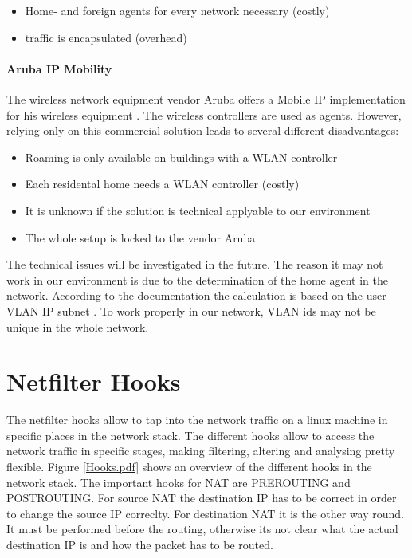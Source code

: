 \documentclass{report}
\begin{document}
\begin{itemize}
\itemsep1pt\parskip0pt
\item
  Home- and foreign agents for every network necessary (costly)
\item
  traffic is encapsulated (overhead)
\end{itemize}

\paragraph{Aruba IP Mobility}\label{aruba-ip-mobility}

The wireless network equipment vendor Aruba offers a Mobile IP
implementation for his wireless equipment \cite[p. 659]{MobileIP-Aruba}. The wireless
controllers are used as agents. However, relying only on this commercial
solution leads to several different disadvantages:

\begin{itemize}
\itemsep1pt\parskip0pt
\item
  Roaming is only available on buildings with a WLAN controller
\item
  Each residental home needs a WLAN controller (costly)
\item
  It is unknown if the solution is technical applyable to our environment
\item
  The whole setup is locked to the vendor Aruba
\end{itemize}

The technical issues will be investigated in the future. The reason it may not
work in our environment is due to the determination of the home agent in the network.
According to the documentation the calculation is based on the user VLAN IP subnet \cite[p. 661]{MobileIP-Aruba}.
To work properly in our network, VLAN ids may not be unique in the whole network.


\section{Netfilter Hooks}\label{netfilter-hooks}

The netfilter hooks\cite{hooks} allow to tap into the network traffic on a linux
machine in specific places in the network stack. The different hooks
allow to access the network traffic in specific stages, making filtering,
altering and analysing pretty flexible. Figure \ref{Hooks.pdf} shows an overview of the different hooks in the network stack.
The important hooks for NAT are PREROUTING and
POSTROUTING. For source NAT the destination IP has to be correct in order to change the source IP correclty. For destination NAT
it is the other way round. It must be performed before the routing,
otherwise its not clear what the actual destination IP is and how the packet has to be routed.
\end{document}
